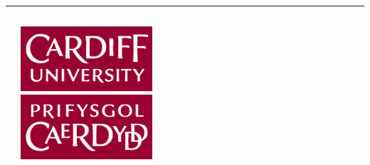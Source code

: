 \documentclass[usenames,dvipsnames,t]{beamer}
\begin{document}
\hrule height 5pt 
\begin{columns}
    \begin{column}{.1\linewidth}
    \end{column}
    \begin{column}{.2\linewidth}
        \vspace{0.7cm}

        \includegraphics[width=0.4\textwidth]{static/cardiff_uni_logo.jpg}
    \end{column}
    \begin{column}{.2\linewidth}
        \vspace{0.7cm}

        \faTwitter \ NikoletaGlyn \\
        \faGithub \ Nikoleta-v3}
    \end{column}
    \begin{column}{.7\linewidth}
    \end{column}
\end{columns}
\end{document}
